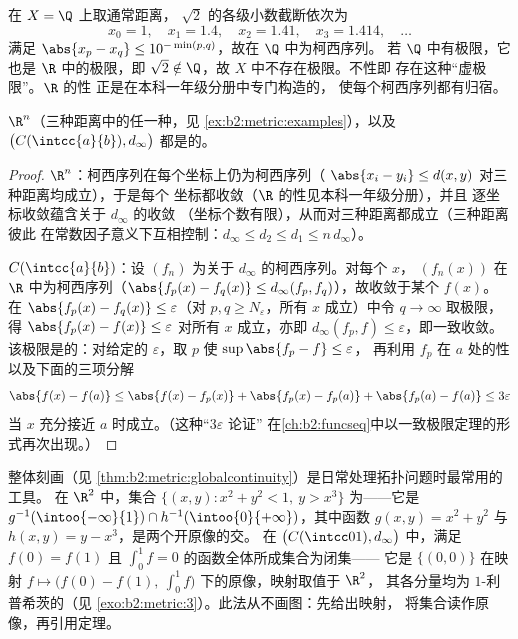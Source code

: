 \begin{example}[无极限的柯西序列]\label{ex:b2:metric:cauchynolimit}
在 $X = \Q$ 上取通常距离，
$\sqrt2$ 的各级小数截断依次为
\[
x_0 = 1,\quad x_1 = 1.4,\quad x_2 = 1.41,\quad x_3 = 1.414,
\quad\dots
\]
满足 $\abs{x_p - x_q} \leq 10^{-\min(p,q)}$，故在 $\Q$ 中为柯西序列。
若 $\Q$ 中有极限，它也是 $\R$ 中的极限，即
$\sqrt2 \notin \Q$，故 $X$ 中不存在极限。不性即
存在这种“虚极限”。$\R$ 的性
正是在本科一年级分册中专门构造的，
使每个柯西序列都有归宿。
\end{example}

\begin{theorem}\label{thm:b2:metric:rncomplete}
$\R^n$（三种距离中的任一种，见
\cref{ex:b2:metric:examples}），以及 $\bigl(C(\intcc{a}{b}),
d_\infty\bigr)$ 都是的。
\end{theorem}

\begin{proof}
$\R^n$：柯西序列在每个坐标上仍为柯西序列（
$\abs{x_i - y_i} \leq d(x,y)$ 对三种距离均成立），于是每个
坐标都收敛（$\R$ 的性见本科一年级分册），并且
逐坐标收敛蕴含关于 $d_\infty$ 的收敛
（坐标个数有限），从而对三种距离都成立（三种距离彼此
在常数因子意义下互相控制：$d_\infty
\leq d_2 \leq d_1 \leq n\,d_\infty$）。

$C(\intcc{a}{b})$：设 $(f_n)$ 为关于 $d_\infty$ 的柯西序列。对每个 $x$，
$(f_n(x))$ 在 $\R$ 中为柯西序列（$\abs{f_p(x) - f_q(x)} \leq
d_\infty(f_p, f_q)$），故收敛于某个 $f(x)$。
在 $\abs{f_p(x) - f_q(x)} \leq \varepsilon$（对 $p, q
\geq N_\varepsilon$，所有 $x$ 成立）中令 $q \to \infty$ 取极限，得 $\abs{f_p(x) -
f(x)} \leq \varepsilon$ 对所有 $x$ 成立，亦即 $d_\infty(f_p, f) \leq
\varepsilon$，即一致收敛。该极限是的：对给定的
$\varepsilon$，取 $p$ 使 $\sup\abs{f_p - f} \leq \varepsilon$，
再利用 $f_p$ 在 $a$ 处的性以及下面的三项分解
\[
\abs{f(x) - f(a)} \leq \abs{f(x) - f_p(x)} + \abs{f_p(x) - f_p(a)}
+ \abs{f_p(a) - f(a)} \leq 3\varepsilon
\]
当 $x$ 充分接近 $a$ 时成立。（这种“$3\varepsilon$ 论证”
在\cref{ch:b2:funcseq}中以一致极限定理的形式再次出现。）
\end{proof}

\begin{example}[由连续性识别开集与闭集]\label{ex:b2:metric:recognize}
整体刻画（见
\cref{thm:b2:metric:globalcontinuity}）是日常处理拓扑问题时最常用的工具。
在 $\R^2$ 中，集合 $\{(x, y) : x^2 + y^2
< 1,\ y > x^3\}$ 为——它是 $g^{-1}(\intoo{-\infty}{1})
\cap h^{-1}(\intoo{0}{+\infty})$，其中函数 $g(x,y) =
x^2 + y^2$ 与 $h(x, y) = y - x^3$，是两个开原像的交。
在 $\bigl(C(\intcc01), d_\infty\bigr)$ 中，满足
$f(0) = f(1)$ 且 $\int_0^1 f = 0$ 的函数全体所成集合为闭集——
它是 $\{(0,0)\}$ 在映射 $f \mapsto
\bigl(f(0) - f(1),\ \int_0^1 f\bigr)$ 下的原像，映射取值于 $\R^2$，
其各分量均为 $1$-利普希茨的（见
\cref{exo:b2:metric:3}）。此法从不画图：先给出映射，
将集合读作原像，再引用定理。
\end{example}

